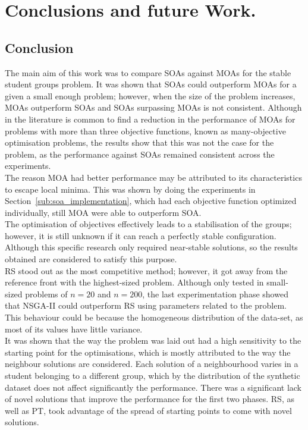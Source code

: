 \chapter{Conclusions and future Work.}
\label{chapter:chapter08}

\section{Conclusion}

The main aim of this work was to compare SOAs against MOAs for the stable student groups problem. It was shown that SOAs could outperform MOAs for a given a small enough problem; however, when the size of the problem increases, MOAs outperform SOAs and SOAs surpassing MOAs is not consistent. Although in the literature is common to find a reduction in the performance of MOAs for problems with more than three objective functions, known as many-objective optimisation problems, the results show that this was not the case for the problem, as the performance against SOAs remained consistent across the experiments. \\

The reason MOA had better performance may be attributed to its characteristics to escape local minima. This was shown by doing the experiments in Section~\ref{sub:soa_implementation}, which had each objective function optimized individually, still MOA were able to outperform SOA.\\

The optimisation of objectives effectively leads to a stabilisation of the groups; however, it is still unknown if it can reach a perfectly stable configuration. Although this specific research only required near-stable solutions, so the results obtained are considered to satisfy this purpose.\\

RS stood out as the most competitive method; however, it got away from the reference front with the highest-sized problem. Although only tested in small-sized problems of $n=20$ and $n=200$, the last experimentation phase showed that NSGA-II could outperform RS using parameters related to the problem. This behaviour could be because the homogeneous distribution of the data-set, as most of its values have little variance.\\

It was shown that the way the problem was laid out had a high sensitivity to the starting point for the optimisations, which is mostly attributed to the way the neighbour solutions are considered. Each solution of a neighbourhood varies in a student belonging to a different group, which by the distribution of the synthetic dataset does not affect significantly the performance. There was a significant lack of novel solutions that improve the performance for the first two phases. RS, as well as PT, took advantage of the spread of starting points to come with novel solutions.\\

